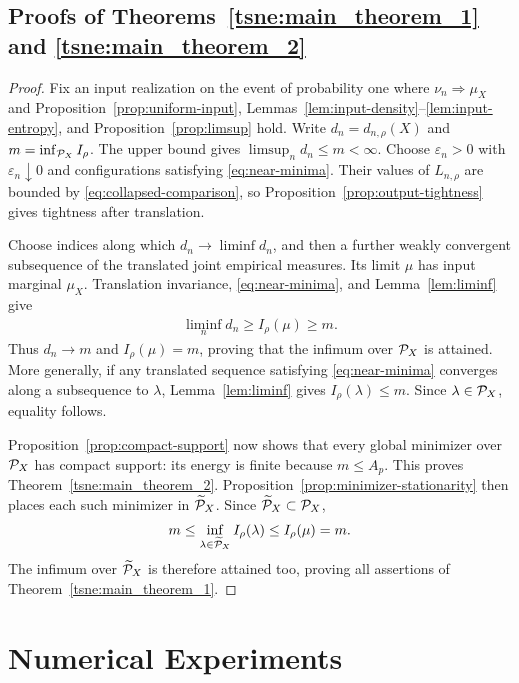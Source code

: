 \subsection{Proofs of Theorems~\ref{tsne:main_theorem_1} and \ref{tsne:main_theorem_2}}\label{sec:main-proof}
\begin{proof}
Fix an input realization on the event of probability one where $\nu_n\Rightarrow\mu_X$ and Proposition~\ref{prop:uniform-input}, Lemmas~\ref{lem:input-density}--\ref{lem:input-entropy}, and Proposition~\ref{prop:limsup} hold. Write $d_n=d_{n,\rho}(X)$ and $m=\inf_{\mathcal P_X}I_\rho$. The upper bound gives $\limsup_n d_n\leq m<\infty$. Choose $\varepsilon_n>0$ with $\varepsilon_n\downarrow0$ and configurations satisfying \eqref{eq:near-minima}. Their values of $L_{n,\rho}$ are bounded by \eqref{eq:collapsed-comparison}, so Proposition~\ref{prop:output-tightness} gives tightness after translation.

Choose indices along which $d_n\to\liminf d_n$, and then a further weakly convergent subsequence of the translated joint empirical measures. Its limit $\mu$ has input marginal $\mu_X$. Translation invariance, \eqref{eq:near-minima}, and Lemma~\ref{lem:liminf} give
\begin{align}
\liminf_n d_n\geq I_\rho(\mu)\geq m.
\end{align}
Thus $d_n\to m$ and $I_\rho(\mu)=m$, proving that the infimum over $\mathcal P_X$ is attained. More generally, if any translated sequence satisfying \eqref{eq:near-minima} converges along a subsequence to $\lambda$, Lemma~\ref{lem:liminf} gives $I_\rho(\lambda)\leq m$. Since $\lambda\in\mathcal P_X$, equality follows.

Proposition~\ref{prop:compact-support} now shows that every global minimizer over $\mathcal P_X$ has compact support: its energy is finite because $m\leq A_p$. This proves Theorem~\ref{tsne:main_theorem_2}. Proposition~\ref{prop:minimizer-stationarity} then places each such minimizer in $\widetilde{\mathcal P}_X$. Since $\widetilde{\mathcal P}_X\subset\mathcal P_X$,
\begin{align}
m\leq\inf_{\lambda\in\widetilde{\mathcal P}_X}I_\rho(\lambda)\leq I_\rho(\mu)=m.
\end{align}
The infimum over $\widetilde{\mathcal P}_X$ is therefore attained too, proving all assertions of Theorem~\ref{tsne:main_theorem_1}.
\end{proof}

\section{Numerical Experiments}\label{sec:numerical}

